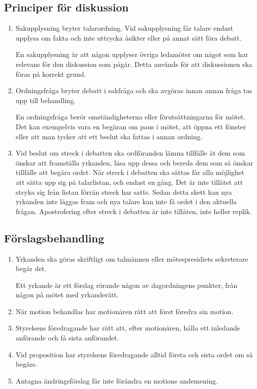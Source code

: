 \documentclass{dvd}
\begin{document}
\subsection{Principer för diskussion}

\begin{enumerate}[label=\arabic* §, ref=\arabic*]
	\item Sakupplysning bryter talarordning.
	      Vid sakupplysning får talare endast upplysa om fakta och inte uttrycka åsikter eller på annat sätt föra debatt.

	      En sakupplysning är att någon upplyser övriga ledamöter om något som har relevans för den diskussion som pågår.
	      Detta används för att diskussionen ska föras på korrekt grund.

	\item Ordningsfråga bryter debatt i sakfråga och ska avgöras innan annan fråga tas upp till behandling.

	      En ordningsfråga berör omständigheterna eller förutsättningarna för mötet.
	      Det kan exempelvis vara en begäran om paus i mötet, att öppna ett fönster eller att man tycker att ett beslut ska fattas i annan ordning.

	\item  Vid beslut om streck i debatten ska ordföranden lämna tillfälle åt dem som önskar att framställa yrkanden, läsa upp dessa och bereda dem som så önskar tillfälle att begära ordet.
	      När streck i debatten ska sättas får alla möjlighet att sätta upp sig på talarlistan, och endast en gång.
	      Det är inte tillåtet att stryka sig från listan förrän streck har satts.
	      Sedan detta skett kan nya yrkanden inte läggas fram och nya talare kan inte få ordet i den aktuella frågan.
	      Apostrofering efter streck i debatten är inte tillåten, inte heller replik.
\end{enumerate}

\subsection{Förslagsbehandling}

\begin{enumerate}[label=\arabic* §, ref=\arabic*]
	\item Yrkanden ska göras skriftligt om talmännen eller mötespresidiets sekreterare begär det.

	      Ett yrkande är ett förslag rörande någon av dagordningens punkter, från någon på mötet med yrkanderätt.

	\item När motion behandlas har motionären rätt att först föredra sin motion.

	\item Styrelsens föredragande har rätt att, efter motionären, hålla ett inledande anförande och få sista anförandet.

	\item Vid proposition har styrelsens föredragande alltid första och sista ordet om så begärs.

	\item Antagna ändringsförslag får inte förändra en motions andemening.
\end{enumerate}
\end{document}
